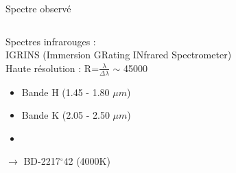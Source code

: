 \documentclass[10pt]{beamer}
\begin{document}
\begin{frame}[fragile]{Spectre observé}
\begin{columns}
    \begin{column}{0.3\textwidth}
             Spectres infrarouges : \\
             IGRINS (Immersion GRating INfrared Spectrometer) \\ 
             Haute résolution : R=$\frac{\lambda}{\Delta \lambda}$ $\sim$ 45000
    					\begin{itemize}
    						\item Bande H (1.45 - 1.80 $\mu m$)
    						\item Bande K (2.05 - 2.50 $\mu m$)
    						\item[]
    					\end{itemize}
        $\rightarrow$ BD-2217$^{\circ}$42 (4000K) \\


\end{column}
\end{columns}
\end{frame}
\end{document}
